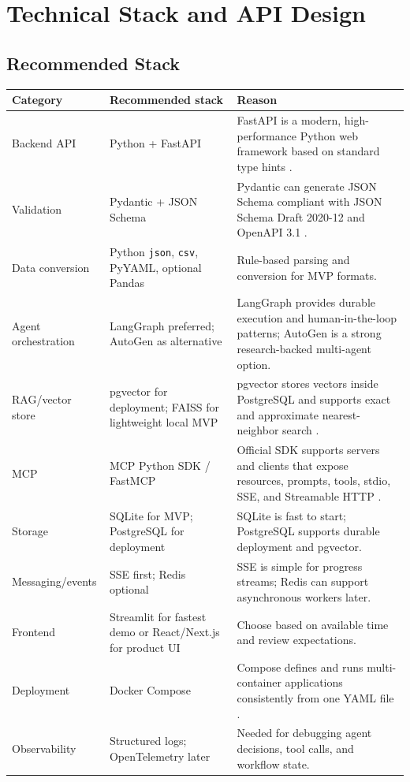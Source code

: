 \section{Technical Stack and API Design}

\subsection{Recommended Stack}

\begin{longtable}{p{}p{}p{}}
\toprule
\textbf{Category} & \textbf{Recommended stack} & \textbf{Reason} \\
\midrule
Backend API & Python + FastAPI & FastAPI is a modern, high-performance Python web framework based on standard type hints \cite{fastapiDocs}. \\
Validation & Pydantic + JSON Schema & Pydantic can generate JSON Schema compliant with JSON Schema Draft 2020-12 and OpenAPI 3.1 \cite{pydanticJsonSchema}. \\
Data conversion & Python \texttt{json}, \texttt{csv}, PyYAML, optional Pandas & Rule-based parsing and conversion for MVP formats. \\
Agent orchestration & LangGraph preferred; AutoGen as alternative & LangGraph provides durable execution and human-in-the-loop patterns; AutoGen is a strong research-backed multi-agent option. \\
RAG/vector store & pgvector for deployment; FAISS for lightweight local MVP & pgvector stores vectors inside PostgreSQL and supports exact and approximate nearest-neighbor search \cite{pgvector}. \\
MCP & MCP Python SDK / FastMCP & Official SDK supports servers and clients that expose resources, prompts, tools, stdio, SSE, and Streamable HTTP \cite{mcpPythonSdk}. \\
Storage & SQLite for MVP; PostgreSQL for deployment & SQLite is fast to start; PostgreSQL supports durable deployment and pgvector. \\
Messaging/events & SSE first; Redis optional & SSE is simple for progress streams; Redis can support asynchronous workers later. \\
Frontend & Streamlit for fastest demo or React/Next.js for product UI & Choose based on available time and review expectations. \\
Deployment & Docker Compose & Compose defines and runs multi-container applications consistently from one YAML file \cite{dockerCompose}. \\
Observability & Structured logs; OpenTelemetry later & Needed for debugging agent decisions, tool calls, and workflow state. \\
\bottomrule
\end{longtable}

